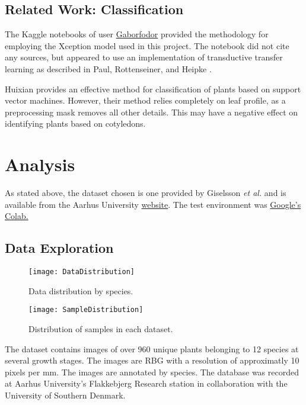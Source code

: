 \documentclass[]{article}
\begin{document}
\subsection{Related Work: Classification}

The Kaggle notebooks of user
\href{https://www.kaggle.com/gaborfodor/seedlings-pretrained-keras-models/data
}{Gaborfodor} provided the methodology for employing the Xception model used in this project.
The notebook did not cite any sources, but appeared to use an implementation of transductive transfer learning as described in Paul, Rottenseiner, and Heipke \cite{Paul2015}.

Huixian\cite{Huixian2020} provides an effective method for classification of plants based on support vector machines. However, their method relies completely on leaf profile, as a preprocessing mask removes all other details. This may have a negative effect on identifying plants based on cotyledons.

\section{Analysis}

As stated above, the dataset chosen is one provided by Giselsson \emph{et al.}\cite{Giselsson2017} and is available from the Aarhus University 
\href{https://vision.eng.au.dk/plant-seedlings-dataset/}{website}.
The test environment was \href{https://colab.research.google.com/}{Google's Colab.}

\subsection{Data Exploration}

\begin{wrapfigure}{l}{0.5\textwidth}
	\begin{center}
		\texttt{[image: DataDistribution]}
	\end{center}
	\caption{Data distribution by species.}	
	\begin{center}
		\texttt{[image: SampleDistribution]}
	\end{center}
	\caption{Distribution of samples in each dataset.}
\end{wrapfigure}

The dataset contains images of over 960 unique plants belonging to 12 species at several growth stages. 
The images are RBG with a resolution of approximatly 10 pixels per mm.
The images are annotated by species.
The database was recorded at Aarhus University's Flakkebjerg Research station in  collaboration with the University of Southern Denmark.
\end{document}
